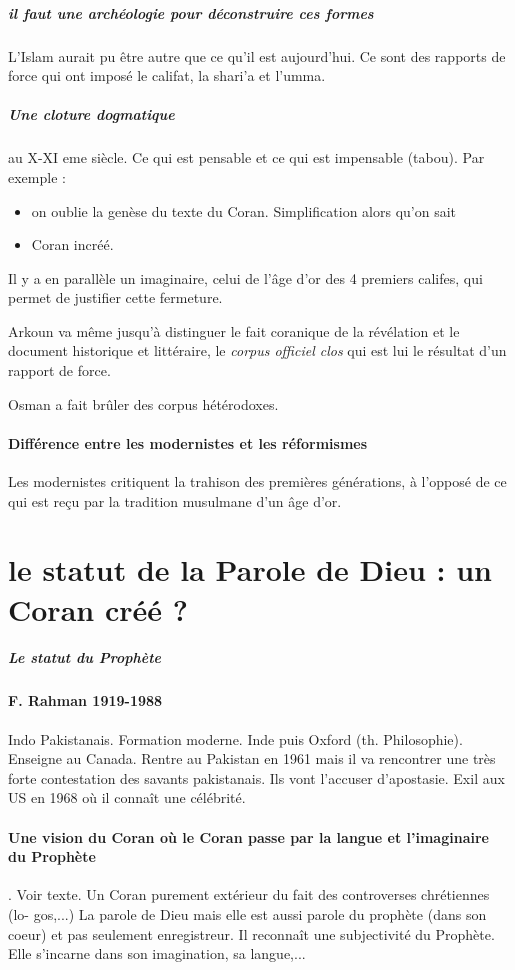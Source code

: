 \subparagraph{il faut une archéologie pour déconstruire ces formes}  L'Islam aurait pu être autre que ce qu'il est aujourd'hui. Ce sont des rapports de force qui ont imposé le califat, la shari'a et l'umma. 
\subparagraph{Une cloture dogmatique} au X-XI eme siècle. Ce qui est pensable et ce qui est impensable (tabou). Par exemple :
\begin{itemize}
    \item on oublie la genèse du texte du Coran. Simplification alors qu'on sait
    \item Coran incréé.
\end{itemize}
Il y a en parallèle un imaginaire, celui de l'âge d'or des 4 premiers califes, qui permet de justifier cette fermeture.

Arkoun va même jusqu'à distinguer le fait coranique de la révélation et le document historique et littéraire, le \textit{corpus officiel clos} qui est lui le résultat d'un rapport de force. 
\begin{Ex}
Osman a fait brûler des corpus hétérodoxes.
\end{Ex}


\paragraph{Différence entre les modernistes et les réformismes} Les modernistes critiquent la trahison des premières générations, à l'opposé de ce qui est reçu par la tradition musulmane d'un âge d'or.



\section{le statut de la Parole de Dieu : un Coran créé ?}



\subparagraph{Le statut du Prophète }

\paragraph{F. Rahman 1919-1988} Indo Pakistanais. Formation moderne. Inde puis Oxford (th. Philosophie). Enseigne au Canada. Rentre au Pakistan en 1961 mais il va rencontrer une très forte contestation des savants pakistanais. Ils vont l'accuser d'apostasie. Exil aux US en 1968 où il connaît une célébrité.

\paragraph{Une vision du Coran où le Coran passe par la langue et l'imaginaire du Prophète}. Voir texte. Un Coran purement extérieur du fait des controverses chrétiennes (lo-
gos,...) La parole de Dieu mais elle est aussi parole du prophète (dans
son coeur) et pas seulement enregistreur. Il reconnaît une subjectivité du
Prophète. Elle s’incarne dans son imagination, sa langue,...


